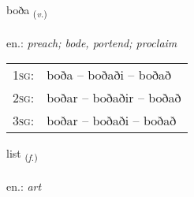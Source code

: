 \documentclass[frontgrid, backgrid]{flacards}\usepackage[]{graphicx}\usepackage[]{xcolor}
\begin{document}
\renewcommand{\flhead}{\vskip5pt \fboxsep=0pt {\small\bfseries\footnotesize Sagnorð | Verb}}
\renewcommand{\fcfoot}{\vskip5pt \fboxsep=0pt \hspace{2pt}{\small\bfseries\footnotesize 2K}}

\renewcommand{\blhead}{\vskip5pt {\small\bfseries\footnotesize Sagnorð | Verb }}
\renewcommand{\bcfoot}{\vskip5pt \hspace{2pt}{\small\bfseries\footnotesize 2K}}


{boða \small{\textsubscript{(\textit{v.})}} \\[1ex] %
\textphonetic{[pɔːða]} \\
en.: \emph{preach; bode, portend; proclaim} \\  [2ex]
\renewcommand*{\arraystretch}{0.8}
\begin{tabular}{p{1cm}l}
\textsc{1sg}: & boða -- boðaði -- boðað \\ 
\textsc{2sg}: & boðar -- boðaðir -- boðað \\ 
\textsc{3sg}: & boðar -- boðaði -- boðað \\ 
\end{tabular}
}

\renewcommand{\flhead}{\vskip5pt \fboxsep=0pt {\small\bfseries\footnotesize Nafnorð | Noun}}
\renewcommand{\fcfoot}{\vskip5pt \fboxsep=0pt \hspace{2pt}{\small\bfseries\footnotesize 2K}}

\renewcommand{\blhead}{\vskip5pt {\small\bfseries\footnotesize Nafnorð | Noun }}
\renewcommand{\bcfoot}{\vskip5pt \hspace{2pt}{\small\bfseries\footnotesize 2K}}


{list \small{\textsubscript{(\textit{f.})}} \\[1ex] %
\textphonetic{[lɪst]} \\
en.: \emph{art} \\  [2ex]
\renewcommand*{\arraystretch}{0.8}
}
\end{document}
